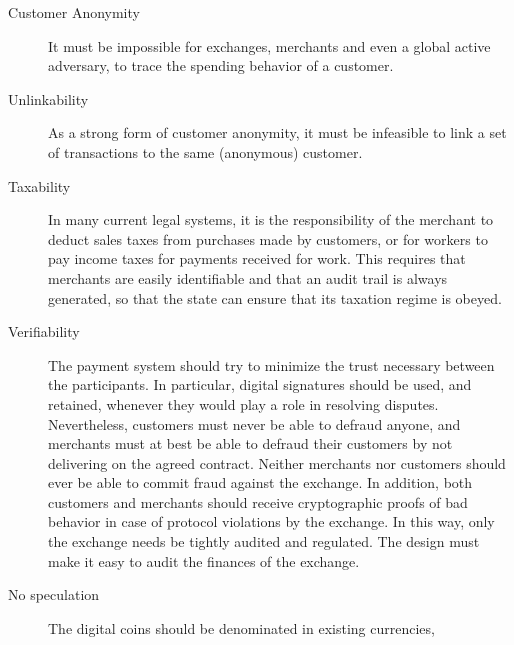 \documentclass{llncs}
\begin{document}
\begin{description}
  \item[Customer Anonymity]
    It must be impossible for exchanges, merchants and even a global active
    adversary, to trace the spending behavior of a customer.
  \item[Unlinkability]
    As a strong form of customer anonymity, it must be infeasible to
    link a set of transactions to the same (anonymous) customer.
  \item[Taxability]
    In many current legal systems, it is the responsibility of the merchant
    to deduct sales taxes from purchases made by customers, or for workers
    to pay income taxes for payments received for work.
    This requires that merchants are easily identifiable and that
    an audit trail is always generated, so that the state can ensure that its
    taxation regime is obeyed.
  \item[Verifiability]
    The payment system should try to minimize the trust necessary between
    the participants.  In particular, digital signatures should be used,
    and retained, whenever they would play a role in resolving disputes. %
    Nevertheless, customers must never be able to defraud anyone, and
    merchants must at best be able to defraud their customers by not
    delivering on the agreed contract.  Neither merchants nor customers
    should ever be able to commit fraud against the exchange.  
    In addition, both customers and merchants should receive cryptographic
    proofs of bad behavior in case of protocol violations by the exchange.
    In this way, only the exchange needs be tightly audited and regulated.
    The design must make it easy to audit the finances of the exchange.
  \item[No speculation] %
    The digital coins should be denominated in existing currencies,

\end{description}
\end{document}
